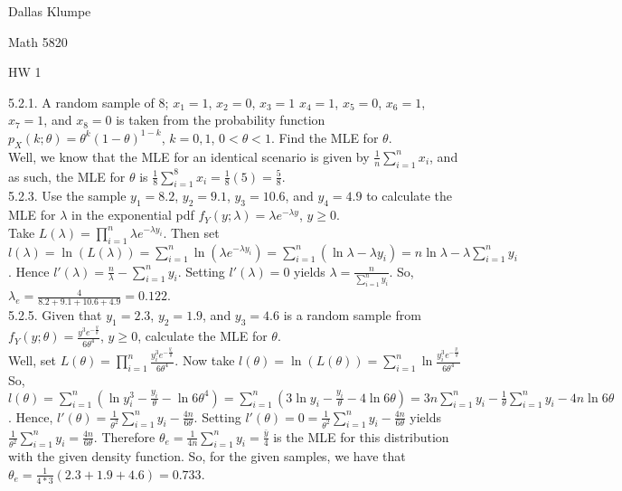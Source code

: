 \documentclass[12pt]{article}
\begin{document}
\noindent Dallas Klumpe

\noindent Math 5820

\noindent HW 1

5.2.1. A random sample of 8; $x_1=1$, $x_2=0$, $x_3=1$ $x_4=1$, $x_5=0$, $x_6=1$, $x_7=1$, and $x_8=0$ is taken from the probability function $p_X(k;\theta)=\theta^k(1-\theta)^{1-k}$, $k=0,1$, $0<\theta<1$. Find the MLE for $\theta$.\\
Well, we know that the MLE for an identical scenario is given by $\frac1n\sum_{i=1}^nx_i$, and as such, the MLE for $\theta$ is $\frac18\sum_{i=1}^8x_i=\frac18(5)=\frac58$.\\[20pt]

5.2.3. Use the sample $y_1=8.2$, $y_2=9.1$, $y_3=10.6$, and $y_4=4.9$ to calculate the MLE for $\lambda$ in the exponential pdf $f_Y(y;\lambda)=\lambda e^{-\lambda y}$, $y\geq0$.\\
Take $L(\lambda)=\prod_{i=1}^n\lambda e^{-\lambda y_i}.$ Then set $l(\lambda)=\ln(L(\lambda))=\sum_{i=1}^n\ln(\lambda e^{-\lambda y_i})=\sum_{i=1}^n(\ln\lambda-\lambda y_i)=n\ln\lambda-\lambda\sum_{i=1}^ny_i$. Hence $l'(\lambda)=\frac{n}{\lambda}-\sum_{i=1}^ny_i$. Setting $l'(\lambda)=0$ yields $\lambda=\frac{n}{\sum_{i=1}^ny_i}$. So, $\lambda_e=\frac{4}{8.2+9.1+10.6+4.9}=0.122$.\\[20pt]

5.2.5. Given that $y_1=2.3$, $y_2=1.9$, and $y_3=4.6$ is a random sample from $f_Y(y;\theta)=\frac{y^3e^{-\frac{y}{\theta}}}{6\theta^4}$, $y\geq0$, calculate the MLE for $\theta$.\\
Well, set $L(\theta)=\prod_{i=1}^n\frac{y_i^3e^{-\frac{y_i}{\theta}}}{6\theta^4}$. Now take $l(\theta)=\ln (L(\theta))=\sum_{i=1}^n\ln\frac{y_i^3e^{-\frac{y_i}{\theta}}}{6\theta^4}$ So, $l(\theta)=\sum_{i=1}^n(\ln y_i^3-\frac{y_i}{\theta}-\ln6\theta^4)=\sum_{i=1}^n(3\ln y_i-\frac{y_i}{\theta}-4\ln6\theta)=3n\sum_{i=1}^ny_i-\frac{1}{\theta}\sum_{i=1}^ny_i-4n\ln6\theta$. Hence, $l'(\theta)=\frac{1}{\theta^2}\sum_{i=1}^ny_i-\frac{4n}{6\theta}$. Setting $l'(\theta)=0=\frac{1}{\theta^2}\sum_{i=1}^ny_i-\frac{4n}{6\theta}$ yields $\frac{1}{\theta^2}\sum_{i=1}^ny_i=\frac{4n}{6\theta}$. Therefore $\theta_e=\frac{1}{4n}\sum_{i=1}^ny_i=\frac{\bar{y}}{4}$ is the MLE for this distribution with the given density function. So, for the given samples, we have that $\theta_e=\frac{1}{4*3}(2.3+1.9+4.6)=0.733$.\\[20pt]
\end{document}
